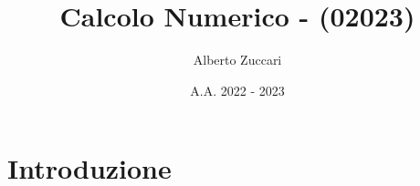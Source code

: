 \documentclass[hidelinks]{book}
\title{Calcolo Numerico - (02023)}
\author{Alberto Zuccari}
\date{A.A. 2022 - 2023}
\begin{document}
\maketitle

\section{Introduzione}
\end{document}
